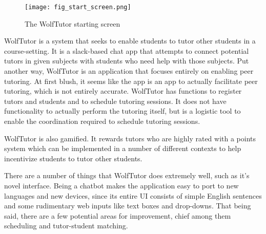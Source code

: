 \begin{figure}[ht]
  \caption{The WolfTutor starting screen} 
  \centering
    \label{fig:start_screen}
    \texttt{[image: fig\_start\_screen.png]}
\end{figure}

WolfTutor is a system that seeks to enable students to tutor other students in a
course-setting. It is a slack-based chat app that attempts to connect potential
tutors in given subjects with students who need help with those subjects. Put
another way, WolfTutor is an application that focuses entirely on enabling 
peer tutoring. At first blush, it seems like the app is an app to actually
facilitate peer tutoring, which is not entirely accurate. WolfTutor has
functions to register tutors and students and to schedule tutoring sessions. It
does not have functionality to actually perform the tutoring itself, but is a
logistic tool to enable the coordination required to schedule tutoring sessions.

WolfTutor is also gamified. It rewards tutors who are highly rated with a points
system which can be implemented in a number of different contexts to help
incentivize students to tutor other students.

There are a number of things that WolfTutor does extremely well, such as 
it's novel interface.  Being a chatbot makes the application easy to port to
new languages and new devices, since its entire UI consists of simple English
sentences and some rudimentary web inputs like text boxes and drop-downs.  That
being said, there are a few potential areas for improvement, chief among them
scheduling and tutor-student matching. 

